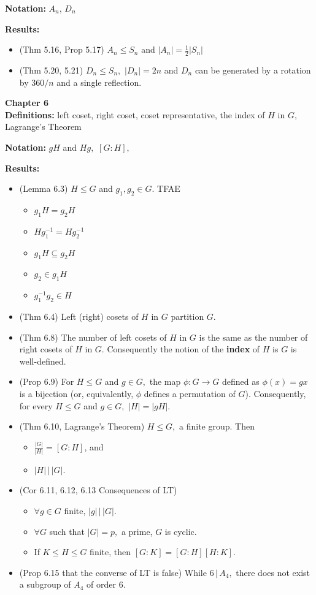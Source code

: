 \documentclass[12pt]{article}
\renewcommand{\emph}[1]{\textsf{\textbf{#1}}}
\begin{document}
\noindent \textbf{Notation:} $A_n$, $D_n$

\noindent \textbf{Results:}
\begin{itemize}
	\item (Thm 5.16, Prop 5.17) $A_n \leq S_n$ and $|A_n| = \frac{1}{2}|S_n|$
	\item (Thm 5.20, 5.21) $D_n \leq S_n,$ $|D_n|=2n$ and $D_n$ can be generated by a rotation by $360/n$ and a single reflection.
\end{itemize}

\noindent \textbf{Chapter 6}\\

\noindent \textbf{Definitions:} left coset, right coset, coset representative, the index of $H$ in $G,$ Lagrange's Theorem

\noindent \textbf{Notation:} $gH$ and $Hg,$ $[G:H],$

\noindent \textbf{Results:}
\begin{itemize}
	\item (Lemma 6.3) $H\leq G$ and $g_1,g_2 \in G$. TFAE
		\begin{itemize}
		\item $g_1H=g_2H$
		\item $Hg_1^{-1}=Hg_2^{-1}$
		\item $g_1H \subseteq g_2H$
		\item $g_2 \in g_1H$
		\item $g_1^{-1}g_2 \in H$
		\end{itemize}
	\item (Thm 6.4) Left (right) cosets of $H$ in $G$ partition $G.$
	\item (Thm 6.8) The number of left cosets of $H$ in $G$ is the same as the number of right cosets of $H$ in $G$. Consequently the notion of the \emph{index} of $H$ is $G$ is well-defined.
	\item (Prop 6.9) For $H \leq G$ and $g \in G,$ the map $\phi:G \to G$ defined as $\phi(x)=gx$ is a bijection (or, equivalently, $\phi$ defines a permutation of $G$). Consequently, for every $H \leq G$ and $g \in G,$ $|H|=|gH|.$
	\item (Thm 6.10, Lagrange's Theorem) $H \leq G,$ a finite group. Then
		\begin{itemize}
		\item $\frac{|G|}{|H|}=[G:H]$, and
		\item $|H| \, \Big| \, |G|.$
		\end{itemize}
	\item (Cor 6.11, 6.12, 6.13 Consequences of LT) 
		\begin{itemize}
		\item $\forall g \in G$ finite, $|g| \, \Big| \, |G|.$
		\item $\forall G$ such that $|G|=p,$ a prime, $G$ is cyclic.
		\item If $K \leq H \leq G$ finite, then $[G:K]=[G:H][H:K].$
		\end{itemize}
	\item (Prop 6.15 that the converse of LT is false) While $6 \, \Big| \, A_4,$ there does not exist a subgroup of $A_4$ of order 6.
\end{itemize}
\end{document}
